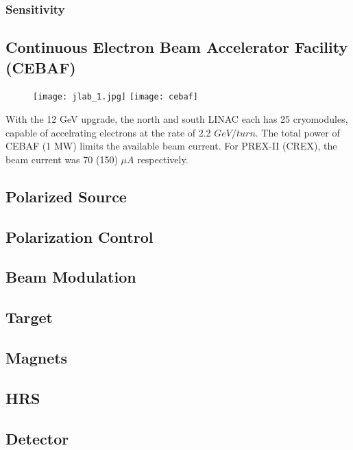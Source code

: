 \subsubsection{Sensitivity}

\subsection{Continuous Electron Beam Accelerator Facility (CEBAF)}
\begin{figure}
    \texttt{[image: jlab\_1.jpg]}
    \texttt{[image: cebaf]}
\end{figure}
With the 12 GeV upgrade, the north and south LINAC each has 25 cryomodules, 
capable of accelrating electrons at the rate of 2.2 $GeV/turn$. The total power
of CEBAF (1 MW) limits the available beam current. For PREX-II (CREX), 
the beam current was 70 (150) $\mu A$ respectively.

\subsection{Polarized Source}

\subsection{Polarization Control}

\subsection{Beam Modulation}

\subsection{Target}

\subsection{Magnets}

\subsection{HRS}

\subsection{Detector}

